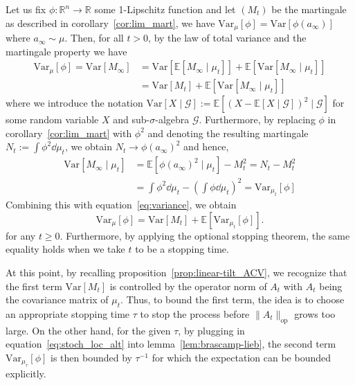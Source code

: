 Let us fix \(\phi : \mathbb{R}^n \to \mathbb{R}\) some 1-Lipschitz function and let \((M_t)\) be the 
martingale as described in corollary~\ref{cor:lim_mart}, we have \(\text{Var}_\mu[\phi] = \text{Var}[\phi(a_\infty)]\) 
where \(a_\infty \sim \mu\).
Then, for all \(t > 0\), by the law of total variance and the martingale property we have
\begin{equation}\label{eq:variance}
  \begin{split}
    \text{Var}_\mu[\phi] = \text{Var}[M_\infty] & = \text{Var}[\mathbb{E}[M_\infty \mid \mu_t]] + \mathbb{E}[\text{Var}[M_\infty \mid \mu_t]]\\
    & = \text{Var}[M_t] + \mathbb{E}[\text{Var}[M_\infty \mid \mu_t]]
  \end{split}
\end{equation}
where we introduce the notation \(\text{Var}[X \mid \mathcal{G}] := \mathbb{E}[(X - \mathbb{E}[X \mid \mathcal{G}])^2 \mid \mathcal{G}]\)
for some random variable \(X\) and sub-\(\sigma\)-algebra \(\mathcal{G}\). Furthermore, by replacing 
\(\phi\) in corollary~\ref{cor:lim_mart} with \(\phi^2\) and denoting the resulting martingale 
\(N_t := \int \phi^2 \dd \mu_t\), we obtain \(N_t \to \phi(a_\infty)^2\) and hence,
\begin{align*}
  \text{Var}[M_\infty \mid \mu_t] & = \mathbb{E}[\phi(a_\infty)^2 \mid \mu_t] - M_t^2 = N_t - M_t^2\\ 
    & = \int \phi^2 \dd \mu_t - \left(\int \phi \dd \mu_t\right)^2 = \text{Var}_{\mu_t}[\phi]
\end{align*}
Combining this with equation~\eqref{eq:variance}, we obtain
\begin{equation}\label{eq:bound}
  \text{Var}_\mu[\phi] = \text{Var}[M_t] + \mathbb{E}[\text{Var}_{\mu_t}[\phi]].
\end{equation}
for any \(t \ge 0\). Furthermore, by applying the optional stopping theorem, the same equality holds 
when we take \(t\) to be a stopping time. 

At this point, by recalling proposition~\ref{prop:linear-tilt_ACV}, we recognize that the first term 
\(\text{Var}[M_t]\) is controlled by the operator norm of \(A_t\) with \(A_t\) being the covariance matrix of \(\mu_t\).
Thus, to bound the first term, the idea is to choose an appropriate stopping time \(\tau\) to 
stop the process before \(\|A_t\|_\text{op}\) grows too large. On the other hand, for the given \(\tau\), by plugging in 
equation~\eqref{eq:stoch_loc_alt} into lemma~\ref{lem:brascamp-lieb},
the second term \(\text{Var}_{\mu_\tau}[\phi]\) is then bounded by \(\tau^{-1}\) for which the
expectation can be bounded explicitly.

